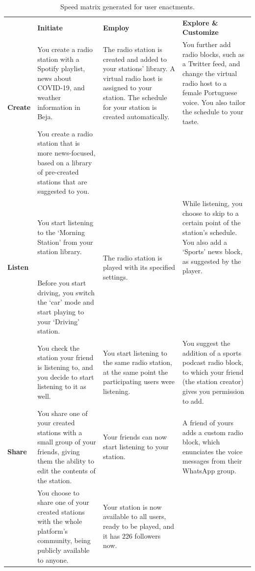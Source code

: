 {{\renewcommand{\arraystretch}{2}%
\begin{table}[]
\setlength\tabcolsep{10pt}
\begin{tabularx}{\textwidth}{|l|X|X|X|}
\hline
\multirow{3}{*}{\textbf{Create}} &
  \textbf{Initiate} &
  \textbf{Employ} &
  \textbf{Explore \& Customize} \\ \cline{2-4} 
 &
  You create a radio station with a Spotify playlist, news about COVID-19, and weather information in Beja. &
  The radio station is created and added to your stations’ library. A virtual radio host is assigned to your station. The schedule for your station is created automatically. &
  You further add radio blocks, such as a Twitter feed, and change the virtual radio host to a female Portuguese voice. You also tailor the schedule to your taste. \\ \cline{2-2}
 &
  You create a radio station that is more news-focused, based on a library of pre-created stations that are suggested to you. &
   &
   \\ \hline
\multirow{2}{*}{\textbf{Listen}} &
  You start listening to the ‘Morning Station’ from your station library. &
  \multirow{2}{4.5cm}{The radio station is played with its specified settings.} &
  While listening, you choose to skip to a certain point of the station’s schedule. You also add a ‘Sports’ news block, as suggested by the player. \\ \cline{2-2} \cline{4-4} 
 &
  Before you start driving, you switch the ‘car’ mode and start playing to your ‘Driving’ station. &
   &
   \\ \hline
\multirow{3}{*}{\textbf{Share}} &
  You check the station your friend is listening to, and you decide to start listening to it as well. &
  You start listening to the same radio station, at the same point the participating users were listening. &
  You suggest the addition of a sports podcast radio block, to which your friend (the station creator) gives you permission to add. \\ \cline{2-4} 
 &
  You share one of your created stations with a small group of your friends, giving them the ability to edit the contents of the station. &
  Your friends can now start listening to your station. &
  A friend of yours adds a custom radio block, which enunciates the voice messages from their WhatsApp group. \\ \cline{2-4} 
 &
  You choose to share one of your created stations with the whole platform’s community, being publicly available to anyone. &
  Your station is now available to all users, ready to be played, and it has 226 followers now. &
   \\ \hline
\end{tabularx}
\caption{Speed matrix generated for user enactments.}
\label{tab:sdmatrix}
\vspace{-4mm}
\end{table}


}}
